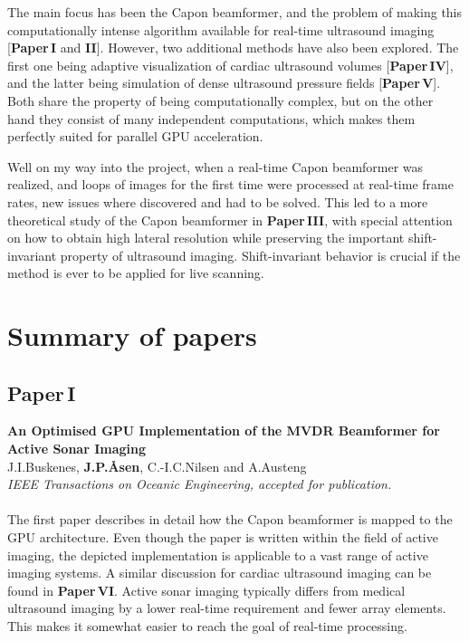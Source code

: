 The main focus has been the Capon beamformer, and the problem of making this computationally intense algorithm available for real-time ultrasound imaging [\textbf{Paper\,I} and \textbf{II}]. However, two additional methods have also been explored. The first one being adaptive visualization of cardiac ultrasound volumes [\textbf{Paper\,IV}], and the latter being simulation of dense ultrasound pressure fields [\textbf{Paper\,V}]. Both share the property of being computationally complex, but on the other hand they consist of many independent computations, which makes them perfectly suited for parallel GPU acceleration.

Well on my way into the project, when a real-time Capon beamformer was realized, and loops of images for the first time were processed at real-time frame rates, new issues where discovered and had to be solved. This led to a more theoretical study of the Capon beamformer in \textbf{Paper\,III}, with special attention on how to obtain high lateral resolution while preserving the important shift-invariant property of ultrasound imaging. Shift-invariant behavior is crucial if the method is ever to be applied for live scanning. 



\section{Summary of papers}

\subsection{Paper\,I}
\textbf{An Optimised GPU Implementation of the MVDR Beamformer for Active Sonar Imaging}\\
J.\:I.\:Buskenes, \textbf{J.\:P.\:\AA{}sen}, C.-I.\:C.\:Nilsen and A.\:Austeng\\
{\it IEEE Transactions on Oceanic Engineering, accepted for publication.}\\\\
The first paper describes in detail how the Capon beamformer is mapped to the GPU architecture. Even though the paper is written within the field of active  imaging, the depicted implementation is applicable to a vast range of active imaging systems. A similar discussion for cardiac ultrasound imaging can be found in \textbf{Paper\,VI}.  Active sonar imaging typically differs from medical ultrasound imaging by a lower real-time requirement and fewer array elements. This makes it somewhat easier to reach the goal of real-time processing. 


